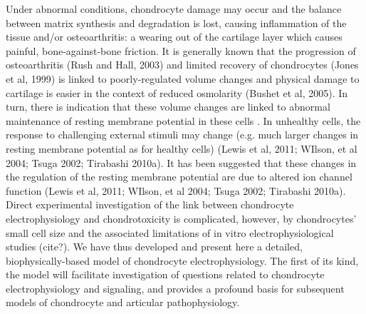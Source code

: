 { %
Under abnormal conditions, chondrocyte damage may occur
and the balance between matrix synthesis and degradation is lost,
causing inflammation of the tissue and/or osteoarthritis: a wearing
out of the cartilage layer which causes painful, bone-against-bone
friction. It is generally known that the progression of osteoarthritis (Rush and
Hall, 2003) and limited recovery  of chondrocytes (Jones et al, 1999)
is linked to poorly-regulated volume changes \citep{Lewisetal2011} and
physical damage to cartilage is easier in the context of reduced
osmolarity (Bushet et al, 2005).  In turn, there is indication that
these volume changes are linked to abnormal maintenance of resting
membrane potential in these cells \citep{Lewisetal2011}.  In unhealthy 
cells, the response to challenging external stimuli may change
(e.g. much larger changes in resting membrane potential as for healthy cells) (Lewis et al,
2011; WIlson, et al 2004; Tsuga 2002; Tirabashi 2010a).  It has been
suggested that these changes in the regulation of the resting membrane
potential are due to altered ion channel function (Lewis et al, 2011;
WIlson, et al 2004; Tsuga 2002; Tirabashi 2010a).  Direct experimental
investigation of the link between chondrocyte electrophysiology and
chondrotoxicity is complicated, however, by chondrocytes' small cell
size and the associated limitations of in vitro electrophysiological
studies (cite?).  We have thus developed and present here a detailed,
biophysically-based model of chondrocyte electrophysiology.  The first
of its kind, the model will facilitate investigation of questions
related to chondrocyte electrophysiology and signaling, and provides a
profound basis for subsequent models of chondrocyte and articular
pathophysiology.

}
